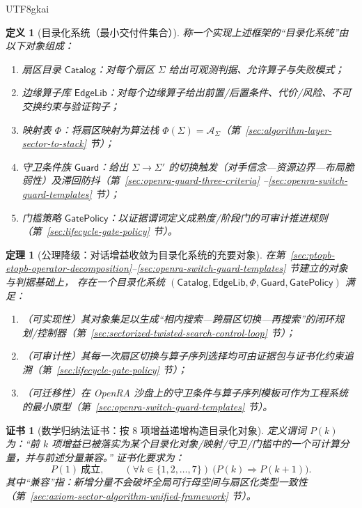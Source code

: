 \documentclass[12pt]{article}
\newtheorem{definition}{定义}[section]
\newtheorem{theorem}{定理}[section]
\newtheorem{Certificate}{证书}[section]
\begin{document}
\begin{CJK*}{UTF8}{gkai}
\begin{definition}[目录化系统（最小交付件集合）]
\label{def:catalog-system-minimal-deliverables}
称一个实现上述框架的“目录化系统”由以下对象组成：
\begin{enumerate}
  \item 扇区目录 $\mathsf{Catalog}$：对每个扇区 $\Sigma$ 给出可观测判据、允许算子与失败模式；
  \item 边缘算子库 $\mathsf{EdgeLib}$：对每个边缘算子给出前置/后置条件、代价/风险、不可交换约束与验证钩子；
  \item 映射表 $\Phi$：将扇区映射为算法栈 $\Phi(\Sigma)=\mathcal{A}_{\Sigma}$（第~\ref{sec:algorithm-layer-sector-to-stack} 节）；
  \item 守卫条件族 $\mathsf{Guard}$：给出 $\Sigma\to\Sigma'$ 的切换触发（对手信念—资源边界—布局脆弱性）及滞回防抖（第~\ref{sec:openra-guard-three-criteria}
    --\ref{sec:openra-switch-guard-templates} 节）；
  \item 门槛策略 $\mathsf{GatePolicy}$：以证据谓词定义成熟度/阶段门的可审计推进规则（第~\ref{sec:lifecycle-gate-policy} 节）。
\end{enumerate}
\end{definition}

\begin{theorem}[公理降级：对话增益收敛为目录化系统的充要对象]
\label{thm:dialogue-gains-to-catalog-system}
在第~\ref{sec:ptopb-etopb-operator-decomposition}--\ref{sec:openra-switch-guard-templates} 节建立的对象与判据基础上，
存在一个目录化系统 $(\mathsf{Catalog},\mathsf{EdgeLib},\Phi,\mathsf{Guard},\mathsf{GatePolicy})$ 满足：
\begin{enumerate}
  \item （可实现性）其对象集足以生成“相内搜索—跨扇区切换—再搜索”的闭环规划/控制器（第~\ref{sec:sectorized-twisted-search-control-loop} 节）；
  \item （可审计性）其每一次扇区切换与算子序列选择均可由证据包与证书化约束追溯（第~\ref{sec:lifecycle-gate-policy} 节）；
  \item （可迁移性）在 OpenRA 沙盘上的守卫条件与算子序列模板可作为工程系统的最小原型（第~\ref{sec:openra-switch-guard-templates} 节）。
\end{enumerate}
\end{theorem}

\begin{Certificate}[数学归纳法证书：按 8 项增益递增构造目录化对象]
\label{cert:dialogue-gains-to-catalog-system}
定义谓词 $P(k)$ 为：“前 $k$ 项增益已被落实为某个目录化对象/映射/守卫/门槛中的一个可计算分量，并与前述分量兼容。”
证书化要求为：
\[
  P(1)\ \text{成立},\qquad
  (\forall k\in\{1,2,\dots,7\})\ \bigl(P(k)\Rightarrow P(k+1)\bigr).
\]
其中“兼容”指：新增分量不会破坏全局可行母空间与扇区化类型一致性（第~\ref{sec:axiom-sector-algorithm-unified-framework} 节）。
\end{Certificate}


\end{CJK*}
\end{document}
